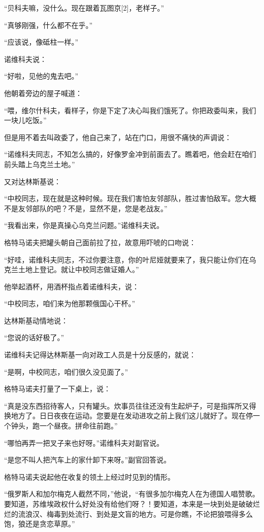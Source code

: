 “贝科夫嘛，没什么。现在跟着瓦图京[2]，老样子。”

“真够刚强，什么都不在乎。”

“应该说，像砥柱一样。”

诺维科夫说：

“好啦，见他的鬼去吧。”

他朝着旁边的屋子喊道：

“喂，维尔什科夫，看样子，你是下定了决心叫我们饿死了。你把政委叫来，我们一块儿吃饭。”

但是用不着去叫政委了，他自己来了，站在门口，用很不痛快的声调说：

“诺维科夫同志，不知怎么搞的，好像罗金冲到前面去了。瞧着吧，他会赶在咱们前头踏上乌克兰土地。”

又对达林斯基说：

“中校同志，现在就是这种时候。现在我们害怕友邻部队，胜过害怕敌军。您大概不是友邻部队的吧？不是，显然不是，您是老战友。”

“我看出来，你是真操心乌克兰问题。”诺维科夫说。

格特马诺夫把罐头朝自己面前拉了拉，故意用吓唬的口吻说：

“好哇，诺维科夫同志，不过你要注意，你的叶尼娅就要来了，我只能让你们在乌克兰土地上登记。就让中校同志做证婚人。”

他举起酒杯，用酒杯指点着诺维科夫，说：

“中校同志，咱们来为他那颗俄国心干杯。”

达林斯基动情地说：

“您说的话好极了。”

诺维科夫记得达林斯基一向对政工人员是十分反感的，就说：

“是啊，中校同志，咱们很久没见面了。”

格特马诺夫打量了一下桌上，说：

“真是没东西招待客人，只有罐头。炊事员往往还没有生起炉子，可是指挥所又得换地方了。日日夜夜在运动。您要是在发动进攻之前上我们这儿就好了。现在停一个钟头，跑一个昼夜。拼命往前跑。”

“哪怕再弄一把叉子来也好呀。”诺维科夫对副官说。

“是您不叫人把汽车上的家什卸下来呀。”副官回答说。

格特马诺夫说起他在收复的领土上经过时见到的情形。

“俄罗斯人和加尔梅克人截然不同，”他说，“有很多加尔梅克人在为德国人唱赞歌。要知道，苏维埃政权什么好处没有给他们呀？！要知道，本来是一块到处是破破烂烂的流浪汉、梅毒到处流行、到处是文盲的地方。可是你瞧，不论把狼喂得多么饱，狼还是贪恋草原。”

